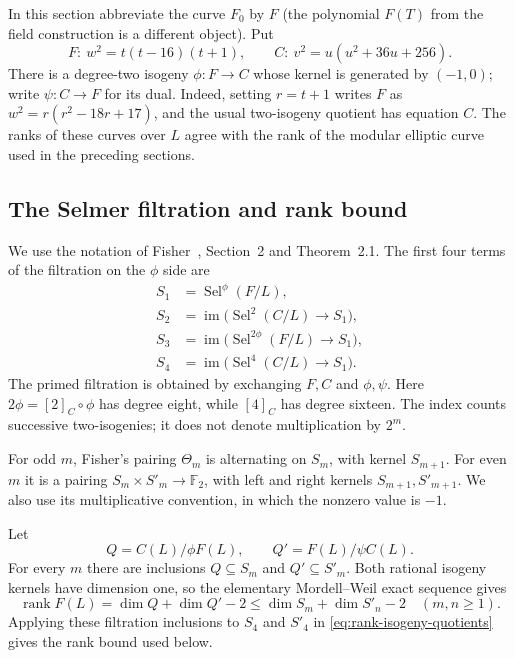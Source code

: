 \documentclass[11pt,a4paper]{article}
\theoremstyle{definition}\newtheorem{definition}[theorem]{Definition}
\theoremstyle{remark}\newtheorem{remark}[theorem]{Remark}
\begin{document}
In this section abbreviate the curve $F_0$ by $F$ (the polynomial
$F(T)$ from the field construction is a different object). Put
\[
 F:\ w^2=t(t-16)(t+1),\qquad
 C:\ v^2=u(u^2+36u+256).
\]
There is a degree-two isogeny $\phi:F\longrightarrow C$ whose kernel is
generated by $(-1,0)$; write $\psi:C\longrightarrow F$ for its dual.
Indeed, setting $r=t+1$ writes $F$ as
$w^2=r(r^2-18r+17)$, and the usual two-isogeny quotient has equation $C$.
The ranks of these curves over $L$ agree with the rank of the modular
elliptic curve used in the preceding sections.

\subsection{The Selmer filtration and rank bound}

We use the notation of Fisher~\cite{Fisher}, Section~2 and Theorem~2.1.
The first four terms of the filtration on the $\phi$ side are
\[
\begin{aligned}
 S_1&=\operatorname{Sel}^{\phi}(F/L),\\
 S_2&=\operatorname{im}\bigl(\operatorname{Sel}^{2}(C/L)
                    \longrightarrow S_1\bigr),\\
 S_3&=\operatorname{im}\bigl(\operatorname{Sel}^{2\phi}(F/L)
                    \longrightarrow S_1\bigr),\\
 S_4&=\operatorname{im}\bigl(\operatorname{Sel}^{4}(C/L)
                    \longrightarrow S_1\bigr).
\end{aligned}
\]
The primed filtration is obtained by exchanging $F,C$ and $\phi,\psi$.
Here $2\phi=[2]_C\circ\phi$ has degree eight, while $[4]_C$ has degree
sixteen.  The index counts successive two-isogenies; it does not denote
multiplication by $2^m$.

For odd $m$, Fisher's pairing $\Theta_m$ is alternating on $S_m$, with
kernel $S_{m+1}$.  For even $m$ it is a pairing
$S_m\times S'_m\longrightarrow\mathbb F_2$, with left and right kernels
$S_{m+1},S'_{m+1}$.  We also use its multiplicative convention, in which
the nonzero value is $-1$.

Let
\[
 Q=C(L)/\phi F(L),\qquad Q'=F(L)/\psi C(L).
\]
For every $m$ there are inclusions $Q\subseteq S_m$ and $Q'\subseteq S'_m$.
Both rational isogeny kernels have dimension one, so the elementary
Mordell--Weil exact sequence gives
\begin{equation}\label{eq:rank-isogeny-quotients}
 \operatorname{rank}F(L)=\dim Q+\dim Q'-2
 \leq \dim S_m+\dim S'_n-2
 \quad(m,n\geq1).
\end{equation}
Applying these filtration inclusions to $S_4$ and $S'_4$ in \eqref{eq:rank-isogeny-quotients} gives the rank bound used below.
\end{document}
